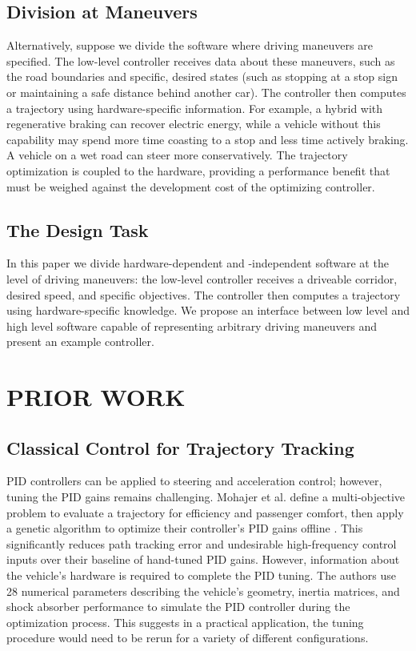 \documentclass[letterpaper, 10 pt, conference]{ieeeconf}  %
\begin{document}
\subsection{Division at Maneuvers} Alternatively, suppose we divide the software where driving maneuvers are specified. The low-level controller receives data about these maneuvers, such as the road boundaries and specific, desired states (such as stopping at a stop sign or maintaining a safe distance behind another car). The controller then computes a trajectory using hardware-specific information. For example, a hybrid with regenerative braking can recover electric energy, while a vehicle without this capability may spend more time coasting to a stop and less time actively braking. A vehicle on a wet road can steer more conservatively. The trajectory optimization is coupled to the hardware, providing a performance benefit that must be weighed against the development cost of the optimizing controller.

\subsection{The Design Task}
In this paper we divide hardware-dependent and -independent software at the level of driving maneuvers: the low-level controller receives a driveable corridor, desired speed, and specific objectives. The controller then computes a trajectory using hardware-specific knowledge. We propose an interface between low level and high level software capable of representing arbitrary driving maneuvers and present an example controller.

\section{PRIOR WORK}

\subsection{Classical Control for Trajectory Tracking}
PID controllers can be applied to steering and acceleration control; however, tuning the PID gains remains challenging. Mohajer et al. define a multi-objective problem to evaluate a trajectory for efficiency and passenger comfort, then apply a genetic algorithm to optimize their controller's PID gains offline \cite{pid}. This significantly reduces path tracking error and undesirable high-frequency control inputs over their baseline of hand-tuned PID gains. However, information about the vehicle's hardware is required to complete the PID tuning. The authors use 28 numerical parameters describing the vehicle's geometry, inertia matrices, and shock absorber performance to simulate the PID controller during the optimization process. This suggests in a practical application, the tuning procedure would need to be rerun for a variety of different configurations.
\end{document}
